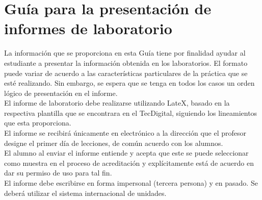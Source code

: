 \documentclass{report}
\begin{document}
\chapter{Guía para la presentación de informes de laboratorio}
La información que se proporciona en esta Guía tiene por finalidad ayudar al
estudiante a presentar la información obtenida en los laboratorios. El formato
puede variar de acuerdo a las características particulares de la práctica que se
esté realizando. Sin embargo, se espera que se tenga en todos los casos un orden
lógico de presentación en el informe.\\
El informe de laboratorio debe realizarse utilizando LateX, basado en la respectiva plantilla que se encontrara en el TecDigital, siguiendo los lineamientos que esta proporciona.\\
El informe se recibirá únicamente en electrónico a la dirección que el profesor
designe el primer día de lecciones, de común acuerdo con los alumnos.\\
El alumno
al enviar el informe entiende y acepta que este se puede seleccionar como
muestra en el proceso de acreditación y explícitamente está de acuerdo en dar su
permiso de uso para tal fin.\\
El informe debe escribirse en forma impersonal (tercera persona) y en
pasado. Se deberá utilizar el sistema internacional de unidades.
\end{document}
